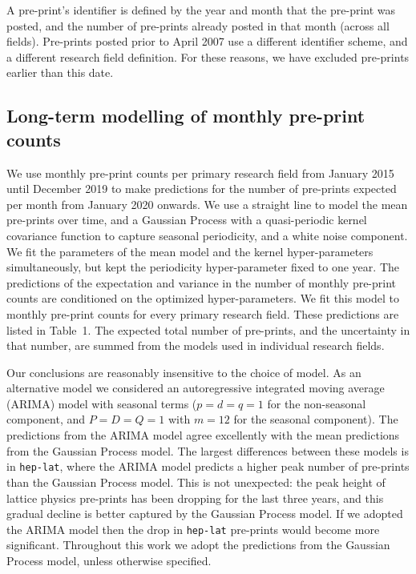 \documentclass[]{rsos}%
\begin{document}
A pre-print's identifier is defined by the year and month that the pre-print was posted, and the number of pre-prints already posted in that month (across all fields). Pre-prints posted prior to April 2007 use a different identifier scheme, and a different research field definition. For these reasons, we have excluded pre-prints earlier than this date. 


\subsection*{Long-term modelling of monthly pre-print counts}

We use monthly pre-print counts per primary research field from January 2015 until December 2019 to make predictions for the number of pre-prints expected per month from January 2020 onwards. We use a straight line to model the mean pre-prints over time, and a Gaussian Process with a quasi-periodic kernel covariance function to capture seasonal periodicity\cite{Rasmussen:2006,Ambikasaran:2014}, and a white noise component. We fit the parameters of the mean model and the kernel hyper-parameters simultaneously, but kept the periodicity hyper-parameter fixed to one year. The predictions of the expectation and variance in the number of monthly pre-print counts are conditioned on the optimized hyper-parameters. We fit this model to monthly pre-print counts for every primary research field. These predictions are listed in Table~1. The expected total number of pre-prints, and the uncertainty in that number, are summed from the models used in individual research fields. 

Our conclusions are reasonably insensitive to the choice of model. As an alternative model we considered an autoregressive integrated moving average (ARIMA) model\cite{BoxJenkins:1970} with seasonal terms ($p=d=q=1$ for the non-seasonal component, and $P=D=Q=1$ with $m=12$ for the seasonal component). The predictions from the ARIMA model agree excellently with the mean predictions from the Gaussian Process model. The largest differences between these models is in \texttt{hep-lat}, where the ARIMA model predicts a higher peak number of pre-prints than the Gaussian Process model. This is not unexpected: the peak height of lattice physics pre-prints has been dropping for the last three years, and this gradual decline is better captured by the Gaussian Process model. If we adopted the ARIMA model then the drop in \texttt{hep-lat} pre-prints would become more significant. Throughout this work we adopt the predictions from the Gaussian Process model, unless otherwise specified.
\end{document}
